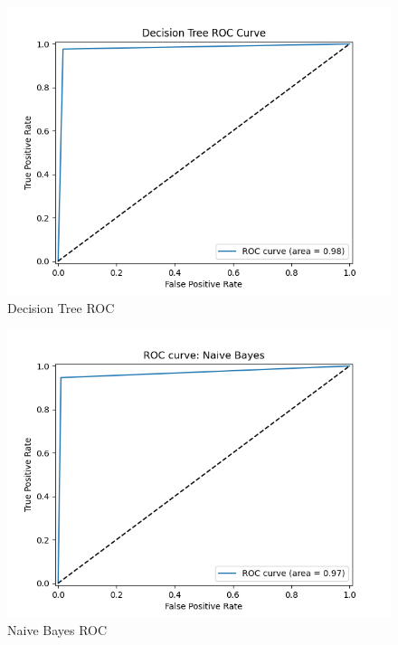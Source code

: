 \begin{figure}[H] %
    \centering
    \includegraphics[width=0.75\linewidth]{figs/decision-treeROC.png}
    \caption{Decision Tree ROC}
    \vspace{-8mm}
\end{figure}



\begin{figure}[H] %
    \centering
    \includegraphics[width=0.75\linewidth]{figs/naive-bayes-ROC.png}
    \caption{Naive Bayes ROC}
    \vspace{-8mm}
\end{figure}

